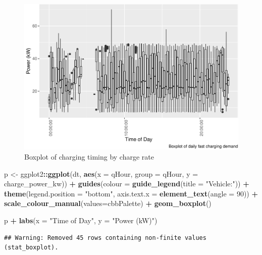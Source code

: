 \documentclass[]{article}
\newenvironment{Shaded}{\begin{snugshade}}{\end{snugshade}}
\newcommand{\KeywordTok}[1]{\textcolor[rgb]{0.13,0.29,0.53}{\textbf{#1}}}
\newcommand{\DataTypeTok}[1]{\textcolor[rgb]{0.13,0.29,0.53}{#1}}
\newcommand{\DecValTok}[1]{\textcolor[rgb]{0.00,0.00,0.81}{#1}}
\newcommand{\StringTok}[1]{\textcolor[rgb]{0.31,0.60,0.02}{#1}}
\newcommand{\OperatorTok}[1]{\textcolor[rgb]{0.81,0.36,0.00}{\textbf{#1}}}
\newcommand{\NormalTok}[1]{#1}
\begin{document}
\begin{figure}
\centering
\includegraphics{EVBB_SummaryReport_files/figure-latex/plot3-1.pdf}
\caption{\label{fig:plot3}Boxplot of charging timing by charge rate}
\end{figure}

\begin{Shaded}
\begin{Highlighting}[]
\NormalTok{p <-}\StringTok{ }\NormalTok{ggplot2}\OperatorTok{::}\KeywordTok{ggplot}\NormalTok{(dt, }\KeywordTok{aes}\NormalTok{(}\DataTypeTok{x =}\NormalTok{ qHour, }\DataTypeTok{group =}\NormalTok{ qHour, }\DataTypeTok{y =}\NormalTok{ charge_power_kw)) }\OperatorTok{+}
\StringTok{  }\KeywordTok{guides}\NormalTok{(}\DataTypeTok{colour =} \KeywordTok{guide_legend}\NormalTok{(}\DataTypeTok{title =} \StringTok{"Vehicle:"}\NormalTok{)) }\OperatorTok{+}
\StringTok{  }\KeywordTok{theme}\NormalTok{(}\DataTypeTok{legend.position =} \StringTok{"bottom"}\NormalTok{, }\DataTypeTok{axis.text.x =} \KeywordTok{element_text}\NormalTok{(}\DataTypeTok{angle =} \DecValTok{90}\NormalTok{)) }\OperatorTok{+}
\StringTok{  }\KeywordTok{scale_colour_manual}\NormalTok{(}\DataTypeTok{values=}\NormalTok{cbbPalette) }\OperatorTok{+}\StringTok{ }
\StringTok{  }\KeywordTok{geom_boxplot}\NormalTok{() }

\NormalTok{p }\OperatorTok{+}\StringTok{ }\KeywordTok{labs}\NormalTok{(}\DataTypeTok{x =} \StringTok{"Time of Day"}\NormalTok{, }\DataTypeTok{y =} \StringTok{"Power (kW)"}\NormalTok{)}
\end{Highlighting}
\end{Shaded}

\begin{verbatim}
## Warning: Removed 45 rows containing non-finite values (stat_boxplot).
\end{verbatim}
\end{document}
